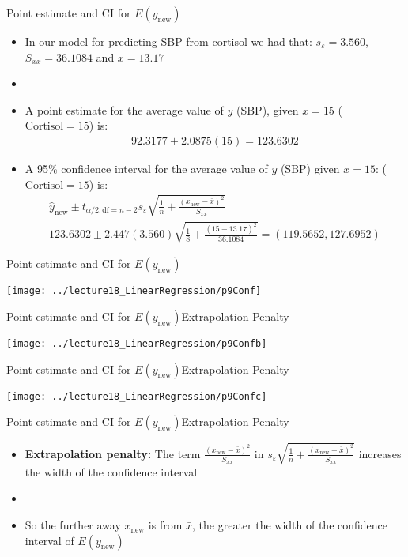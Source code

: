 \documentclass[xcolor=dvipsnames]{beamer}
\begin{document}
\begin{frame}{Point estimate and CI for $E(y_{\text{new}})$}
	\begin{itemize}
		\item In our model for predicting SBP from cortisol we had that: $s_{\varepsilon} = 3.560$, $S_{xx} = 36.1084$ and $\bar{x}=13.17$ \pause
		\item[]
		\item A point estimate for the average value of $y$ (SBP), given $x=15$ ($\text{Cortisol}=15$) is: \pause
		\begin{gather*}
			92.3177 + 2.0875(15) = 123.6302
		\end{gather*}
		\item A 95\% confidence interval for the average value of $y$ (SBP) given $x=15$:  ($\text{Cortisol}=15$) is: \pause
		\begin{gather*}
			\hat{y}_{\text{new}} \pm t_{\alpha / 2, \text{df} = n-2}s_{\varepsilon}\sqrt{\frac{1}{n} + \frac{(x_{\text{new}}-\bar{x})^2}{S_{xx}}} \\
			123.6302 \pm 2.447 (3.560)\sqrt{\frac{1}{8} + \frac{(15-13.17)^2}{36.1084}} = (119.5652, 127.6952)
		\end{gather*}
	\end{itemize}
\end{frame}

\begin{frame}{Point estimate and CI for $E(y_{\text{new}})$}
\begin{center}
	\texttt{[image: ../lecture18\_LinearRegression/p9Conf]}
\end{center}
\end{frame}

\begin{frame}{Point estimate and CI for $E(y_{\text{new}})$}{Extrapolation Penalty}
	\begin{center}
		\texttt{[image: ../lecture18\_LinearRegression/p9Confb]}
	\end{center}
\end{frame}

\begin{frame}{Point estimate and CI for $E(y_{\text{new}})$}{Extrapolation Penalty}
\begin{center}
	\texttt{[image: ../lecture18\_LinearRegression/p9Confc]}
\end{center}
\end{frame}

\begin{frame}{Point estimate and CI for $E(y_{\text{new}})$}{Extrapolation Penalty}
\begin{itemize}
	\item \textbf{Extrapolation penalty:} The term $\frac{(x_{\text{new}}-\bar{x})^2}{S_{xx}}$ in $s_{\varepsilon}\sqrt{\frac{1}{n} + \frac{(x_{\text{new}}-\bar{x})^2}{S_{xx}}}$ increases the width of the confidence interval \pause
	\item[]
	\item So the further away $x_{\text{new}}$ is from $\bar{x}$, the greater the width of the confidence interval of $E(y_{\text{new}})$
\end{itemize}
\end{frame}
\end{document}
